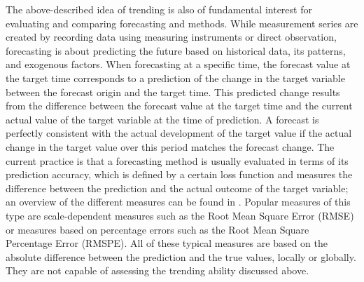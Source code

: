 
The above-described idea of trending is also of fundamental interest for evaluating and comparing forecasting and methods. 
While measurement series are created by recording data using measuring instruments or direct observation, forecasting is about predicting the future based on historical data, its patterns, and exogenous factors. 
When forecasting at a specific time, the forecast value at the target time corresponds to a prediction of the change in the target variable between the forecast origin and the target time. 
This predicted change results from the difference between the forecast value at the target time and the current actual value of the target variable at the time of prediction. 
A forecast is perfectly consistent with the actual development of the target value if the actual change in the target value over this period matches the forecast change. 
The current practice is that a forecasting method is usually evaluated in terms of its prediction accuracy, which is defined by a certain loss function and measures the difference between the prediction and the actual outcome of the target variable; an overview of the different measures can be found in \cite{hyndman2006another}. 
Popular measures of this type are scale-dependent measures such as the Root Mean Square Error (RMSE) or measures based on percentage errors such as the Root Mean Square Percentage Error (RMSPE). 
All of these typical measures are based on the absolute difference between the prediction and the true values, locally or globally. They are not capable of assessing the trending ability discussed above.

